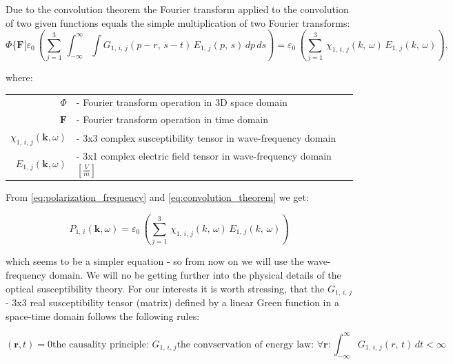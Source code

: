 \documentclass[12pt,twoside,a4paper]{article}
\def\emptyline{\vspace{12pt}}
\numberwithin{equation}{subsection}
\numberwithin{figure}{subsection}
\begin{document}
Due to the convolution theorem \cite{katznelson_introduction} the Fourier transform applied to the convolution of two given
functions equals the simple multiplication of two Fourier transforms:
\begin{equation} \label{eq:convolution_theorem}
  \Phi \textbf{\{F}[ {\varepsilon_{0}}\, \left(  \! \sum_{j=1}^{3}\,\int_{ - \infty }^{\infty }
    \int {G_{1, \,i, \,j}}(p - r, \,s - t)\,{E_{1, \,j}}(p, \,s)\,dp\,ds \!  \right) =
    {\varepsilon_{0}}\,(\sum_{j=1}^{3}\,{\chi_{1, \,i, \,j}}(k, \,\omega )\,{E_{1, \,j}}(k, \,\omega )),
\end{equation}

where: 

\begin{tabular}{r l}
  $\Phi $ & - Fourier transform operation in $3$D space domain \\
  $\textbf{F}$ & - Fourier transform operation in time domain \\
  ${\chi_{1, \,i, \,j}} (\textbf{k},\omega) $ & - 3x3 complex susceptibility tensor in wave-frequency domain
  \cite{fakiszscan} \\ ${E_{1, \,j}} (\textbf{k}, \omega) $ & - 3x1 complex electric field tensor in wave-frequency
  domain $[\frac {V}{m}]$ \\
\end{tabular}

\emptyline

From \ref{eq:polarization_frequency} and \ref{eq:convolution_theorem} we get:

\begin{equation} \label{eq:final_linpolarization}
  {P_{1, \,i}}  (\textbf{k}, \omega) = {\varepsilon_{0}}\,(\sum_{j=1}^{3}\,{\chi_{1, \,i, \,j}}(k,\,\omega )\,{E_{1, \,j}}(k, \,\omega ))
\end{equation}

which seems to be a simpler equation - so from now on we will use the wave-frequency domain. We will no be getting further into the
physical details of the optical susceptibility theory. For our interests it is worth stressing, that the ${G_{1, \,i, \,j}}$  - 3x3 real susceptibility
tensor (matrix) defined by a linear Green function in a space-time domain follows the following rules:

\begin{subequations}  \label{eq:green_properties}
 \begin{equation}  \label{eq:green_causality} (\textbf{r}, t) = 0
   \mbox{the causality principle: } {G_{1, \,i, \,j}}
  \end{equation}
  \begin{equation} \label{eq:green_energy}
    \mbox{the convservation of energy law: }  \forall \textbf{r} : \int_{ - \infty }^{\infty }{G_{1, \,i, \,j}}(r, \,t)\,dt <  \infty
  \end{equation}
\end{subequations}
\end{document}

